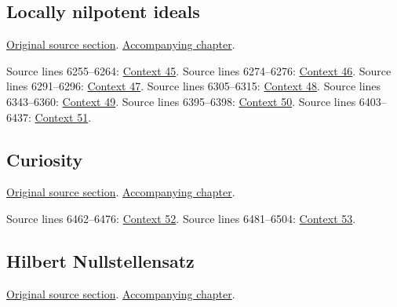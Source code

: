 \subsection{Locally nilpotent ideals}
\hypertarget{algebra-source-section-locally-nilpotent}{}
\noindent\href{https://github.com/stacks/stacks-project/blob/a04446e57ec1fbc252a871afcec7752fb2807b14/algebra.tex\#L6238}{Original source section}. \href{algebra.pdf\#nameddest=section-locally-nilpotent}{Accompanying chapter}.

\begin{AlgebraSourceRoutes}
 Source lines 6255--6264: \hyperlink{algebra-context-045}{Context 45}.
 Source lines 6274--6276: \hyperlink{algebra-context-046}{Context 46}.
 Source lines 6291--6296: \hyperlink{algebra-context-047}{Context 47}.
 Source lines 6305--6315: \hyperlink{algebra-context-048}{Context 48}.
 Source lines 6343--6360: \hyperlink{algebra-context-049}{Context 49}.
 Source lines 6395--6398: \hyperlink{algebra-context-050}{Context 50}.
 Source lines 6403--6437: \hyperlink{algebra-context-051}{Context 51}.
\end{AlgebraSourceRoutes}

\subsection{Curiosity}
\hypertarget{algebra-source-section-curiosity}{}
\noindent\href{https://github.com/stacks/stacks-project/blob/a04446e57ec1fbc252a871afcec7752fb2807b14/algebra.tex\#L6445}{Original source section}. \href{algebra.pdf\#nameddest=section-curiosity}{Accompanying chapter}.

\begin{AlgebraSourceRoutes}
 Source lines 6462--6476: \hyperlink{algebra-context-052}{Context 52}.
 Source lines 6481--6504: \hyperlink{algebra-context-053}{Context 53}.
\end{AlgebraSourceRoutes}

\subsection{Hilbert Nullstellensatz}
\hypertarget{algebra-source-section-nullstellensatz}{}
\noindent\href{https://github.com/stacks/stacks-project/blob/a04446e57ec1fbc252a871afcec7752fb2807b14/algebra.tex\#L6520}{Original source section}. \href{algebra.pdf\#nameddest=section-nullstellensatz}{Accompanying chapter}.

